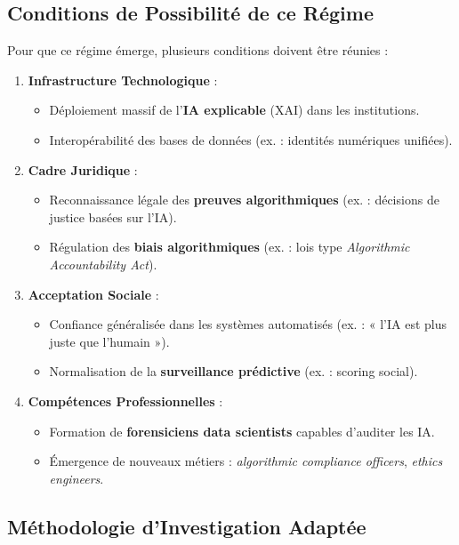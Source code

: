 \documentclass[a4paper,12pt]{report}
\begin{document}
	\subsection*{Conditions de Possibilité de ce Régime}
	Pour que ce régime émerge, plusieurs conditions doivent être réunies :
	\begin{enumerate}
		\item \textbf{Infrastructure Technologique} :
		\begin{itemize}
			\item Déploiement massif de l’\textbf{IA explicable} (XAI) dans les institutions.
			\item Interopérabilité des bases de données (ex. : identités numériques unifiées).
		\end{itemize}
		\item \textbf{Cadre Juridique} :
		\begin{itemize}
			\item Reconnaissance légale des \textbf{preuves algorithmiques} (ex. : décisions de justice basées sur l’IA).
			\item Régulation des \textbf{biais algorithmiques} (ex. : lois type \textit{Algorithmic Accountability Act}).
		\end{itemize}
		\item \textbf{Acceptation Sociale} :
		\begin{itemize}
			\item Confiance généralisée dans les systèmes automatisés (ex. : « l’IA est plus juste que l’humain »).
			\item Normalisation de la \textbf{surveillance prédictive} (ex. : scoring social).
		\end{itemize}
		\item \textbf{Compétences Professionnelles} :
		\begin{itemize}
			\item Formation de \textbf{forensiciens data scientists} capables d’auditer les IA.
			\item Émergence de nouveaux métiers : \textit{algorithmic compliance officers}, \textit{ethics engineers}.
		\end{itemize}
	\end{enumerate}
	
	\subsection*{Méthodologie d’Investigation Adaptée}
\end{document}
